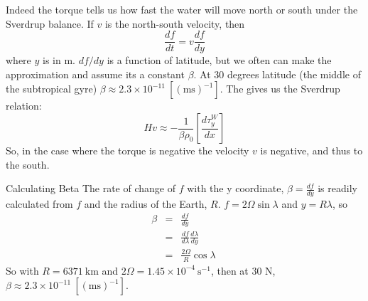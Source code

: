 Indeed the torque tells us how fast the water will move north or south under the Sverdrup balance.  If $v$ is the north-south velocity, then 
\begin{equation}
    \frac{df}{dt} = v \frac{df}{dy}
\end{equation} 
where $y$ is in m.  $df/dy$ is a function of latitude, but we often can make the  approximation and assume its a constant $\beta$.  At 30 degrees latitude (the middle of the subtropical gyre) $\beta \approx 2.3\times 10^{-11}\ \mathrm{[(ms)^{-1}]}$.    The gives us the Sverdrup relation:
\begin{equation}
    Hv  \approx -\frac{1}{\beta \rho_0}\left[\frac{d\tau_y^W}{dx}\right]
    \label{eq:Sverdrup}
\end{equation}
So, in the case where the torque is negative the velocity $v$ is negative, and thus to the south.  

\begin{derivbox}[label={box:beta}]{Calculating Beta}
    The rate of change of $f$ with the y coordinate, $\beta = \frac{df}{dy}$ is readily calculated from $f$ and the radius of the Earth, $R$.  $f=2\Omega \sin \lambda$ and $y = R \lambda$, so  
    \begin{eqnarray*}
        \beta & = & \frac{df}{dy} \\
              & = &  \frac{df}{d\lambda} \frac{d\lambda}{dy} \\
              & = &  \frac{2\Omega}{R} \cos \lambda\  
    \end{eqnarray*}
    So with $R=6371\ \mathrm{km}$ and $2\Omega = 1.45\times10^{-4}\ \mathrm{s^{-1}}$, then at 30 N, $\beta \approx 2.3\times 10^{-11}\ \mathrm{[(ms)^{-1}]}$.  
\end{derivbox}


